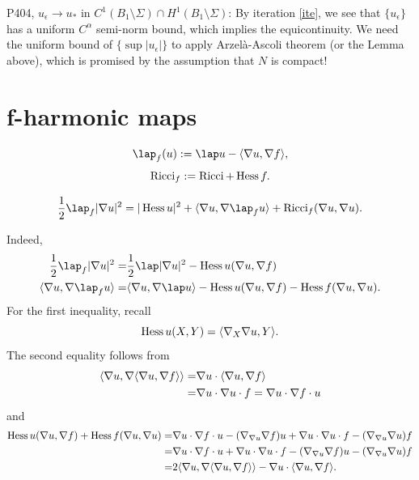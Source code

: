 \documentclass[a4paper,12pt]{article}
\begin{document}
\np P404, $u_{\epsilon } \to u_*$ in $C^1(B_1 \setminus \Sigma ) \cap H^1(B_1 \setminus \Sigma )$:  
By iteration \ref{ite}, we see that $\{u_{\epsilon }\}$    has a uniform $C^{\alpha }$ semi-norm bound, which implies the equicontinuity. We need the uniform bound of $\{\sup |u_{\epsilon }|\}$ to apply Arzelà-Ascoli theorem (or the Lemma above), which is promised by the assumption that $N$ is compact! 




\section{f-harmonic maps}

\begin{definition}
    $$ \lap_f(u):=\lap u -\la \nabla u,\nabla f \ra  ,$$
    $$ \operatorname{Ricci}_f := \operatorname{Ricci} +\operatorname{Hess} f. $$
\end{definition}

\begin{proposition}
 \begin{equation}
   \frac{1}{2} \lap_f |\nabla u|^2=|\hess u|^2+\la \nabla u, \nabla \lap_f u\ra+\ricci_f(\nabla u,\nabla u). 
 \end{equation}
\end{proposition}
Indeed, 
$$ \begin{aligned}
   \frac{1}{2} \lap_f |\nabla u|^2=& \frac{1}{2}\lap |\nabla u|^2-\hess u (\nabla u,\nabla f)\\
   \la \nabla u,\nabla \lap_f u \ra=& \la \nabla u,\nabla \lap u \ra -\hess u(\nabla u,\nabla f)-\hess f(\nabla u,\nabla u).
\end{aligned}  $$
For the first inequality, recall 
$$ \operatorname{Hess} u (X,Y)= \langle \nabla _X \nabla u,  Y \rangle.  $$
The second equality follows from 
$$ \begin{aligned}
    \langle \nabla u,\nabla \langle \nabla u,\nabla f \rangle  \rangle=&\nabla u \cdot \langle \nabla u,\nabla f \rangle  \\
    =& \nabla u \cdot \nabla u \cdot f= \nabla u \cdot \nabla f \cdot u
\end{aligned}  $$
and 
$$ \begin{aligned}
   \operatorname{Hess} u(\nabla u,\nabla f)+\operatorname{Hess} f(\nabla u,\nabla u)=& \nabla u \cdot \nabla f \cdot u-(\nabla _{\nabla u}\nabla f) u+\nabla u \cdot \nabla   u \cdot f -(\nabla _{\nabla u}\nabla u) f\\
   =&\nabla u \cdot \nabla f \cdot u+\nabla u \cdot \nabla   u \cdot f -(\nabla _{\nabla u}\nabla f) u-(\nabla _{\nabla u}\nabla u) f \\
   =& 2 \langle \nabla u,\nabla \langle \nabla u,\nabla f \rangle  \rangle- \nabla u \cdot \langle \nabla u,\nabla f \rangle.
\end{aligned}  $$
\end{document}
